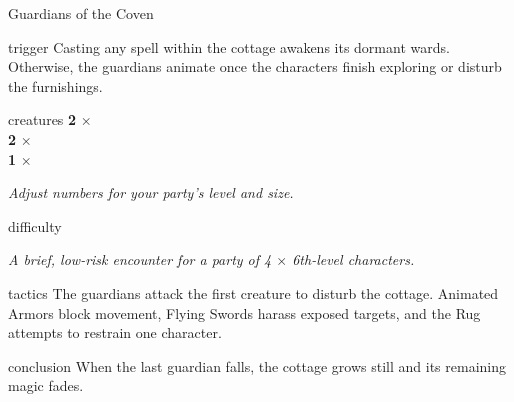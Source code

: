 \begin{EncounterPanel}{Guardians of the Coven}

	\begin{EncounterBlock}{trigger}
		{\entryfont Casting any spell within the cottage awakens its dormant wards. Otherwise, the guardians animate once the characters finish exploring or disturb the furnishings.}
	\end{EncounterBlock}

	\begin{EncounterBlock}{creatures}
		\textbf{2} $\times$ \hyperref[monster:AnimatedArmor]{}\\
		\textbf{2} $\times$ \hyperref[monster:FlyingSword]{}\\
		\textbf{1} $\times$ \hyperref[monster:RugOfSmothering]{}
		
		\textit{\tiny Adjust numbers for your party's level and size.}
	\end{EncounterBlock}

	\begin{EncounterBlock}{difficulty}
    	
		\textit{\tiny A brief, low-risk encounter for a party of 4 $\times$ 6th-level characters.}
	\end{EncounterBlock}

	\begin{EncounterBlock}{tactics}
		{\entryfont The guardians attack the first creature to disturb the cottage. Animated Armors block movement, Flying Swords harass exposed targets, and the Rug attempts to restrain one character.}
	\end{EncounterBlock}

	\begin{EncounterBlock}{conclusion}
		{\entryfont When the last guardian falls, the cottage grows still and its remaining magic fades.}
	\end{EncounterBlock}

\end{EncounterPanel}

